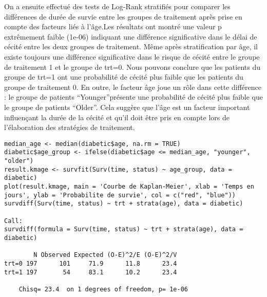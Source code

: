 \documentclass[../main.tex]{subfiles}
\begin{document}
\begin{CJK*}{UTF8}{gbsn}
On a ensuite effectué des tests de Log-Rank stratifiés pour comparer les différences de durée de survie entre les groupes de traitement après prise en compte des facteurs liés à l'âge.Les résultats ont montré une valeur p extrêmement faible (1e-06) indiquant une différence significative dans le délai de cécité entre les deux groupes de traitement. Même après stratification par âge, il existe toujours une différence significative dans le risque de cécité entre le groupe de traitement 1 et le groupe de trt=0. Nous pouvons conclure que les patients du groupe de trt=1 ont une probabilité de cécité plus faible que les patients du groupe de traitement 0. En outre, le facteur âge joue un rôle dans cette différence : le groupe de patients “Younger”présente une probabilité de cécité plus faible que le groupe de patients “Older”. Cela suggère que l'âge est un facteur important influençant la durée de la cécité et qu'il doit être pris en compte lors de l'élaboration des stratégies de traitement.
\begin{lstlisting}
median_age <- median(diabetic$age, na.rm = TRUE)
diabetic$age_group <- ifelse(diabetic$age <= median_age, "younger", "older")
result.kmage <- survfit(Surv(time, status) ~ age_group, data = diabetic)
plot(result.kmage, main = 'Courbe de Kaplan-Meier', xlab = 'Temps en jours', ylab = 'Probabilite de survie', col = c("red", "blue"))
survdiff(Surv(time, status) ~ trt + strata(age), data = diabetic)
    
Call:
survdiff(formula = Surv(time, status) ~ trt + strata(age), data = diabetic)
    
        N Observed Expected (O-E)^2/E (O-E)^2/V
trt=0 197      101     71.9      11.8      23.4
trt=1 197       54     83.1      10.2      23.4
    
    Chisq= 23.4  on 1 degrees of freedom, p= 1e-06
\end{lstlisting}

\end{CJK*}
\end{document}
